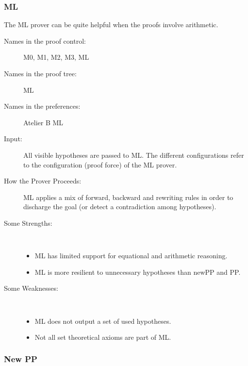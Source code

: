 \subsubsection{ML}

The ML prover can be quite helpful when the proofs involve arithmetic.

\begin{description}
	\item[Names in the proof control:] M0, M1, M2, M3, ML
	\item[Names in the proof tree:] ML
	\item[Names in the preferences:] Atelier B ML
	\item[Input:] All visible hypotheses are passed to ML. The different configurations refer to the configuration (proof force) of the ML prover.
	\item[How the Prover Proceeds:] ML applies a mix of forward, backward and rewriting rules in order to discharge the goal (or detect a contradiction among hypotheses).
	\item[Some Strengths:] ~
	\begin{itemize}
		\item ML has limited support for equational and arithmetic reasoning.
		\item ML is more resilient to unnecessary hypotheses than newPP and PP. 
	\end{itemize}
	\item[Some Weaknesses:] ~
	\begin{itemize}
		\item ML does not output a set of used hypotheses.
		\item Not all set theoretical axioms are part of ML. 
	\end{itemize}
\end{description}


\subsubsection{New PP}

